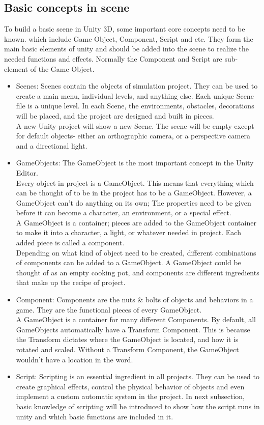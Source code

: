 \subsection{Basic concepts in scene}
To build a basic scene in Unity 3D, some important core concepts need to be known. which include Game Object, Component, Script and etc. They form the main basic elements of unity and should be added into the scene to realize the needed functions and effects. Normally the Component and Script are sub-element of the Game Object.\\
\begin{itemize}
	\item Scenes: Scenes contain the objects of simulation project. They can be used to create a main menu, individual levels, and anything else. Each unique Scene file is a unique level. In each Scene, the environments, obstacles, decorations will be placed, and the project are designed and built in pieces.\\
	A new Unity project will show a new Scene. The scene will be empty except for default objects- either an orthographic camera, or a  perspective camera and a directional light. 
	\item GameObjects: The GameObject is the most important concept in the Unity Editor.\\
	Every object in project is a GameObject. This means that everything which can be thought of to be in the project has to be a GameObject. However, a GameObject can't do anything on its own; The properties need to be given before it can become a character, an environment, or a special effect.\\
	A GameObject is a container; pieces are added to the GameObject container to make it into a character, a light, or whatever needed in project. Each added piece is called a component.\\
	Depending on what kind of object need to be created, different combinations of components can be added to a GameObject. A GameObject could be thought of as an empty cooking pot, and components are different ingredients that make up the recipe of project.  
	\item Component: Components are the nuts \& bolts of objects and behaviors in a game. They are the functional pieces of every GameObject.\\
	A GameObject is a container for many different Components. By default, all GameObjects automatically have a Transform Component. This is because the Transform dictates where the GameObject is located, and how it is rotated and scaled. Without a Transform Component, the GameObject wouldn't have a location in the word.
	\item Script: Scripting is an essential ingredient in all projects. They can be used to create graphical effects, control the physical behavior of objects and even implement a custom automatic system in the project. In next subsection, basic knowledge of scripting will be introduced to show how the script runs in unity and which basic functions are included in it. 
\end{itemize}

